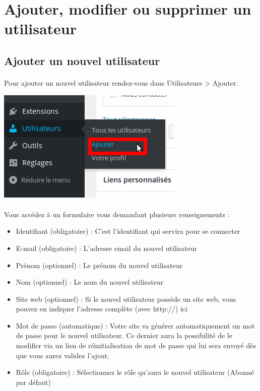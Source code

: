 \documentclass[10pt,a4paper]{article}
\begin{document}
\section{Ajouter, modifier ou supprimer un utilisateur}
\subsection{Ajouter un nouvel utilisateur}
\paragraph{}Pour ajouter un nouvel utilisateur rendez-vous dans Utilisateurs > Ajouter.
\begin{center}
\includegraphics[scale=0.3]{img/0157.png}
\end{center}
\paragraph{}Vous accédez à un formulaire vous demandant plusieurs renseignements :
\begin{itemize}
\item Identifiant (obligatoire) : C'est l'identifiant qui servira pour se connecter
\item E-mail (obligatoire) : L'adresse email du nouvel utilisateur
\item Prénom (optionnel) : Le prénom du nouvel utilisateur
\item Nom (optionnel) : Le nom du nouvel utilisateur
\item Site web (optionnel) : Si le nouvel utilisateur possède un site web, vous pouvez en indiquer l'adresse complète (avec http://) ici
\item Mot de passe (automatique) : Votre site va générer automatiquement un mot de passe pour le nouvel utilisateur. Ce dernier aura la possibilité de le modifier via un lien de réinitialisation de mot de passe qui lui sera envoyé dès que vous aurez validez l'ajout.
\item Rôle (obligatoire) : Sélectionnez le rôle qu'aura le nouvel utilisateur (Abonné par défaut)
\end{itemize}
\end{document}
